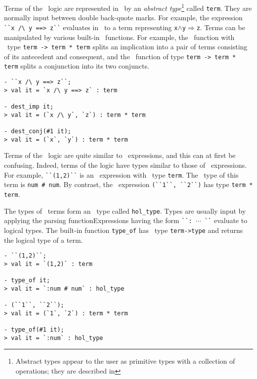 \bigskip

Terms of the \HOL\ logic are represented in \ML\ by an {\it abstract
  type\/}\footnote{Abstract types appear to the user as primitive
  types with a collection of operations; they are described in
  \DESCRIPTION} called {\small\verb|term|}. They are normally input
between double back-quote marks.  For example, the expression
{\small\verb|``x /\ y ==> z``|} evaluates in \ML\ to a term representing
{\small\verb|x|}$\wedge${\small\verb|y|}$\Rightarrow${\small\verb|z|}.
Terms can be manipulated by various built-in \ML\ functions. For
example, the \ML\ function  with \ML\ type
{\small\verb|term -> term * term|} splits an implication into a pair
of terms consisting of its antecedent and consequent, and the \ML\
function  of type {\small\verb|term -> term * term|}
splits a conjunction into its two conjuncts.


\setcounter{sessioncount}{1}
\begin{session}
\begin{verbatim}
- ``x /\ y ==> z``;
> val it = `x /\ y ==> z` : term

- dest_imp it;
> val it = (`x /\ y`, `z`) : term * term

- dest_conj(#1 it);
> val it = (`x`, `y`) : term * term
\end{verbatim}
\end{session}

Terms of the \HOL\ logic are quite similar to \ML\ expressions, and
this can at first be confusing.  Indeed, terms of the logic have types
similar to those of \ML\ expressions.  For example,
{\small\verb|``(1,2)``|} is an \ML\ expression with \ML\ type
{\small\verb|term|}.  The \HOL\ type of this term is
{\small\verb|num # num|}.  By contrast, the \ML\ expression
{\small\verb|(``1``, ``2``)|} has type {\small\verb|term * term|}.

The types of \HOL\ terms form an \ML\ type called
{\small\verb|hol_type|}.  Types are usually input by applying the
parsing functionExpressions having the form
{\small\verb|``: |}$\cdots${\small\verb| ``|} evaluate to logical
types.
The built-in function {\small\verb|type_of|} has \ML\ type
{\small\verb|term->type|} and returns the logical type of a term.

\begin{session}
\begin{verbatim}
- ``(1,2)``;
> val it = `(1,2)` : term

- type_of it;
> val it = `:num # num` : hol_type

- (``1``, ``2``);
> val it = (`1`, `2`) : term * term

- type_of(#1 it);
> val it = `:num` : hol_type
\end{verbatim}
\end{session}

